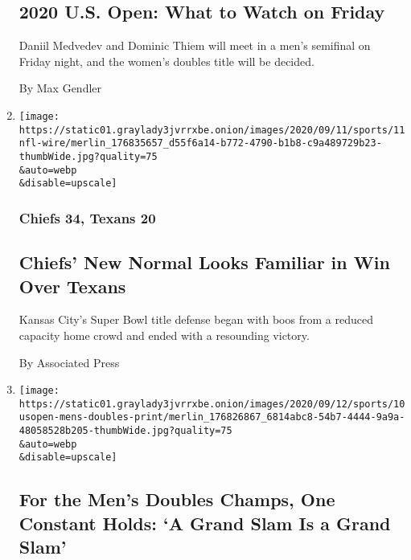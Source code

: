 \begin{enumerate}
  \hypertarget{2020-us-open-what-to-watch-on-friday}{%
  \subsection{2020 U.S. Open: What to Watch on
  Friday}\label{2020-us-open-what-to-watch-on-friday}}

  Daniil Medvedev and Dominic Thiem will meet in a men's semifinal on
  Friday night, and the women's doubles title will be decided.

  By Max Gendler
\item
  \href{/2020/09/11/sports/football/kansas-city-chiefs-texans-score.html}{}

  \texttt{[image: https://static01.graylady3jvrrxbe.onion/images/2020/09/11/sports/11nfl-wire/merlin\_176835657\_d55f6a14-b772-4790-b1b8-c9a489729b23-thumbWide.jpg?quality=75\\\&auto=webp\\\&disable=upscale]}

  \hypertarget{chiefs-34-texans-20-1}{%
  \subsubsection{Chiefs 34, Texans 20}\label{chiefs-34-texans-20-1}}

  \hypertarget{chiefs-new-normal-looks-familiar-in-win-over-texans}{%
  \subsection{Chiefs' New Normal Looks Familiar in Win Over
  Texans}\label{chiefs-new-normal-looks-familiar-in-win-over-texans}}

  Kansas City's Super Bowl title defense began with boos from a reduced
  capacity home crowd and ended with a resounding victory.

  By Associated Press
\item
  \href{/2020/09/10/sports/us-open-mens-doubles-final.html}{}

  \texttt{[image: https://static01.graylady3jvrrxbe.onion/images/2020/09/12/sports/10usopen-mens-doubles-print/merlin\_176826867\_6814abc8-54b7-4444-9a9a-48058528b205-thumbWide.jpg?quality=75\\\&auto=webp\\\&disable=upscale]}

  \hypertarget{for-the-mens-doubles-champs-one-constant-holds-a-grand-slam-is-a-grand-slam}{%
  \subsection{For the Men's Doubles Champs, One Constant Holds: `A Grand
  Slam Is a Grand
  Slam'}\label{for-the-mens-doubles-champs-one-constant-holds-a-grand-slam-is-a-grand-slam}}


\end{enumerate}
